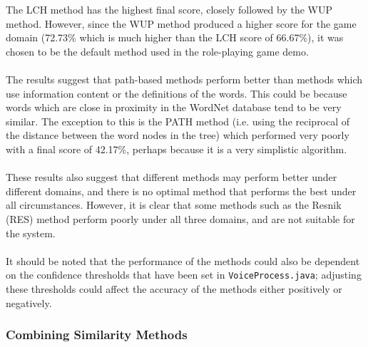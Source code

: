 \documentclass[11pt]{article}
\begin{document}
The LCH method has the highest final score, closely followed by the WUP method. However, since the WUP method produced a higher score for the game domain (72.73\% which is much higher than the LCH score of 66.67\%), it was chosen to be the default method used in the role-playing game demo.
\\
\\
The results suggest that path-based methods perform better than methods which use information content or the definitions of the words. This could be because words which are close in proximity in the WordNet database tend to be very similar. The exception to this is the PATH method (i.e. using the reciprocal of the distance between the word nodes in the tree) which performed very poorly with a final score of 42.17\%, perhaps because it is a very simplistic algorithm.
\\
\\
These results also suggest that different methods may perform better under different domains, and there is no optimal method that performs the best under all circumstances. However, it is clear that some methods such as the Resnik (RES) method perform poorly under all three domains, and are not suitable for the system.
\\
\\
It should be noted that the performance of the methods could also be dependent on the confidence thresholds that have been set in \texttt{VoiceProcess.java}; adjusting these thresholds could affect the accuracy of the methods either positively or negatively.

\subsubsection{Combining Similarity Methods}
\end{document}
